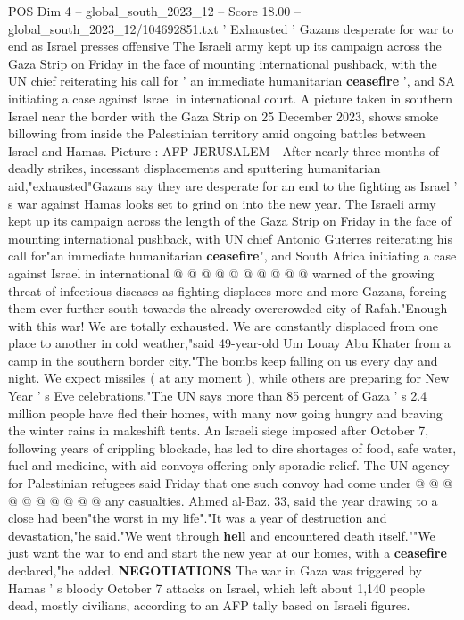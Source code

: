 \begin{textsample}{POS Dim 4 – global\_south\_2023\_12 – Score 18.00 – global\_south\_2023\_12/104692851.txt}  \label{ex:f4_pos_146}
' Exhausted ' Gazans desperate for war to end as Israel presses offensive The Israeli army kept up its campaign across the Gaza Strip on Friday in the face of mounting international pushback, with the UN chief reiterating his call for ' an immediate humanitarian \textbf{ceasefire} ', and SA initiating a case against Israel in international court.
A picture taken in southern Israel near the border with the Gaza Strip on 25 December 2023, shows smoke billowing from inside the Palestinian territory amid ongoing battles between Israel and Hamas.
Picture : AFP JERUSALEM - After nearly three months of deadly strikes, incessant displacements and sputtering humanitarian aid,"exhausted"Gazans say they are desperate for an end to the fighting as Israel ' s war against Hamas looks set to grind on into the new year.
The Israeli army kept up its campaign across the length of the Gaza Strip on Friday in the face of mounting international pushback, with UN chief Antonio Guterres reiterating his call for"an immediate humanitarian \textbf{ceasefire}", and South Africa initiating a case against Israel in international @ @ @ @ @ @ @ @ @ @ warned of the growing threat of infectious diseases as fighting displaces more and more Gazans, forcing them ever further south towards the already-overcrowded city of Rafah."Enough with this war!
We are totally exhausted.
We are constantly displaced from one place to another in cold weather,"said 49-year-old Um Louay Abu Khater from a camp in the southern border city."The bombs keep falling on us every day and night.
We expect missiles ( at any moment ), while others are preparing for New Year ' s Eve celebrations."The UN says more than 85 percent of Gaza ' s 2.4 million people have fled their homes, with many now going hungry and braving the winter rains in makeshift tents.
An Israeli siege imposed after October 7, following years of crippling blockade, has led to dire shortages of food, safe water, fuel and medicine, with aid convoys offering only sporadic relief.
The UN agency for Palestinian refugees said Friday that one such convoy had come under @ @ @ @ @ @ @ @ @ @ any casualties.
Ahmed al-Baz, 33, said the year drawing to a close had been"the worst in my life"."It was a year of destruction and devastation,"he said."We went through \textbf{hell} and encountered death itself.""We just want the war to end and start the new year at our homes, with a \textbf{ceasefire} declared,"he added. \textbf{NEGOTIATIONS} The war in Gaza was triggered by Hamas ' s bloody October 7 attacks on Israel, which left about 1,140 people dead, mostly civilians, according to an AFP tally based on Israeli figures.

\end{textsample}
